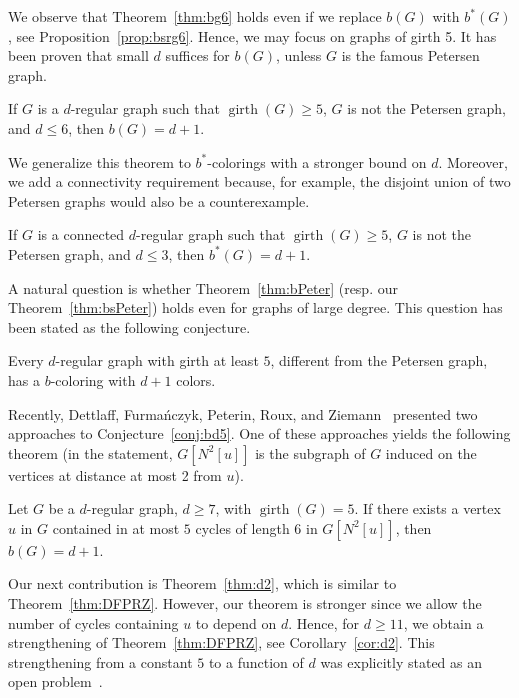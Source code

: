 \documentclass[runningheads, envcountsame]{llncs}
\DeclareMathOperator{\girth}{girth}
\begin{document}
We observe that Theorem~\ref{thm:bg6} holds even if we replace $b(G)$ with $b^*(G)$, see Proposition~\ref{prop:bsrg6}. Hence, we may focus on graphs of girth 5.
It has been proven that small $d$ suffices for $b(G)$, unless $G$ is the famous Petersen graph.

\begin{theorem}\label{thm:bPeter}
If $G$ is a $d$-regular graph such that $\girth(G) \ge 5$, $G$ is not the Petersen graph, and $d \le 6$, then $b(G) = d+1$.
\end{theorem}

We generalize this theorem to $b^*$-colorings with a stronger bound on $d$. Moreover, we add a connectivity requirement because, for example, the disjoint union of two Petersen graphs would also be a counterexample.

\newcommand{\thmPG}{If $G$ is a connected $d$-regular graph such that $\girth(G) \ge 5$, $G$ is not the Petersen graph, and $d \le 3$, then $b^*(G) = d+1$.}

\begin{theorem}\label{thm:bsPeter}
\thmPG
\end{theorem}

A natural question is whether Theorem~\ref{thm:bPeter} (resp. our Theorem~\ref{thm:bsPeter}) holds even for graphs of large degree.
This question has been stated as the following conjecture.

\begin{conjecture}\label{conj:bd5}
Every $d$-regular graph with girth at least $5$, different from the Petersen graph, has a $b$-coloring with $d + 1$ colors.
\end{conjecture}

Recently, Dettlaff, Furmańczyk, Peterin, Roux, and Ziemann~\cite{DETTLAFF2024128914} presented two approaches to Conjecture~\ref{conj:bd5}. One of these approaches yields the following theorem (in the statement, $G[N^2[u]]$ is the subgraph of $G$ induced on the vertices at distance at most 2 from $u$).

\begin{theorem}\label{thm:DFPRZ}
Let $G$ be a $d$-regular graph, $d \ge 7$, with $\girth(G) = 5$. If there exists a vertex $u$ in $G$ contained in at most $5$ cycles of length 6 in $G[N^2[u]]$, then $b(G) = d+1$.
\end{theorem}

Our next contribution is Theorem~\ref{thm:d2}, which is similar to Theorem~\ref{thm:DFPRZ}.
However, our theorem is stronger since we allow the number of cycles containing $u$ to depend on $d$.
Hence, for $d \ge 11$, we obtain a strengthening of Theorem~\ref{thm:DFPRZ}, see Corollary~\ref{cor:d2}.
This strengthening from a constant $5$ to a function of $d$ was explicitly stated as an open problem~\cite[Section 5]{DETTLAFF2024128914}.
\end{document}
